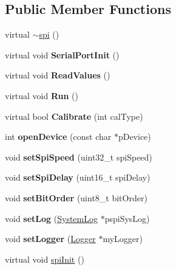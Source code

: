 \subsection*{Public Member Functions}
\begin{DoxyCompactItemize}
\item 
virtual \hyperlink{classspi_aa7039ccea879c1194360b401427f7b93}{$\sim$spi} ()
\item 
\hypertarget{classspi_a34b00f5bd260681619fee418239048a0}{virtual void {\bfseries Serial\-Port\-Init} ()}\label{classspi_a34b00f5bd260681619fee418239048a0}

\item 
\hypertarget{classspi_a94309b811b02a030d1a37eca9e27b286}{virtual void {\bfseries Read\-Values} ()}\label{classspi_a94309b811b02a030d1a37eca9e27b286}

\item 
\hypertarget{classspi_ab4c9b1d0f205e9dfac00107bc8fe1729}{virtual void {\bfseries Run} ()}\label{classspi_ab4c9b1d0f205e9dfac00107bc8fe1729}

\item 
\hypertarget{classspi_a1676554345a6127503f10d117f5b242d}{virtual bool {\bfseries Calibrate} (int cal\-Type)}\label{classspi_a1676554345a6127503f10d117f5b242d}

\item 
\hypertarget{classspi_ab5338399676761d03e503fa8f55ff4f6}{int {\bfseries open\-Device} (const char $\ast$p\-Device)}\label{classspi_ab5338399676761d03e503fa8f55ff4f6}

\item 
\hypertarget{classspi_af0e4702c999e07c9d2655cae8d12d1a4}{void {\bfseries set\-Spi\-Speed} (uint32\-\_\-t spi\-Speed)}\label{classspi_af0e4702c999e07c9d2655cae8d12d1a4}

\item 
\hypertarget{classspi_a24d0af0b21a8f58127d18c7cf77f0fd2}{void {\bfseries set\-Spi\-Delay} (uint16\-\_\-t spi\-Delay)}\label{classspi_a24d0af0b21a8f58127d18c7cf77f0fd2}

\item 
\hypertarget{classspi_aa81694fe53868e64ad9ef35e9003ac96}{void {\bfseries set\-Bit\-Order} (uint8\-\_\-t bit\-Order)}\label{classspi_aa81694fe53868e64ad9ef35e9003ac96}

\item 
\hypertarget{classspi_aa1251c2275e3a868291c85106de2f44b}{void {\bfseries set\-Log} (\hyperlink{classSystemLog}{System\-Log} $\ast$pspi\-Sys\-Log)}\label{classspi_aa1251c2275e3a868291c85106de2f44b}

\item 
\hypertarget{classspi_a868d26f2805f7a0a5ab2b45fef847a3d}{void {\bfseries set\-Logger} (\hyperlink{classLogger}{Logger} $\ast$my\-Logger)}\label{classspi_a868d26f2805f7a0a5ab2b45fef847a3d}

\item 
virtual void \hyperlink{classspi_af6b5a441ef9014df209fa3803d0fa68f}{spi\-Init} ()
\end{DoxyCompactItemize}
